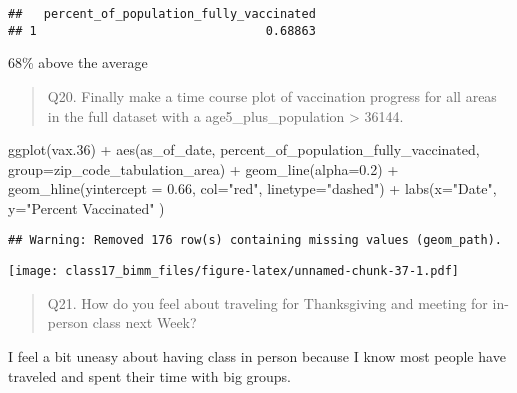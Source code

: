 \documentclass[
]{article}
\newenvironment{Shaded}{\begin{snugshade}}{\end{snugshade}}
\newcommand{\AttributeTok}[1]{\textcolor[rgb]{0.77,0.63,0.00}{#1}}
\newcommand{\FloatTok}[1]{\textcolor[rgb]{0.00,0.00,0.81}{#1}}
\newcommand{\FunctionTok}[1]{\textcolor[rgb]{0.00,0.00,0.00}{#1}}
\newcommand{\NormalTok}[1]{#1}
\newcommand{\SpecialCharTok}[1]{\textcolor[rgb]{0.00,0.00,0.00}{#1}}
\newcommand{\StringTok}[1]{\textcolor[rgb]{0.31,0.60,0.02}{#1}}
\begin{document}
\begin{verbatim}
##   percent_of_population_fully_vaccinated
## 1                                0.68863
\end{verbatim}

68\% above the average

\begin{quote}
Q20. Finally make a time course plot of vaccination progress for all
areas in the full dataset with a age5\_plus\_population \textgreater{}
36144.
\end{quote}

\begin{Shaded}
\begin{Highlighting}[]
\FunctionTok{ggplot}\NormalTok{(vax}\FloatTok{.36}\NormalTok{) }\SpecialCharTok{+} \FunctionTok{aes}\NormalTok{(as\_of\_date,}
\NormalTok{      percent\_of\_population\_fully\_vaccinated,}
      \AttributeTok{group=}\NormalTok{zip\_code\_tabulation\_area) }\SpecialCharTok{+} \FunctionTok{geom\_line}\NormalTok{(}\AttributeTok{alpha=}\FloatTok{0.2}\NormalTok{) }\SpecialCharTok{+} \FunctionTok{geom\_hline}\NormalTok{(}\AttributeTok{yintercept =} \FloatTok{0.66}\NormalTok{, }\AttributeTok{col=}\StringTok{"red"}\NormalTok{, }\AttributeTok{linetype=}\StringTok{"dashed"}\NormalTok{) }\SpecialCharTok{+} \FunctionTok{labs}\NormalTok{(}\AttributeTok{x=}\StringTok{"Date"}\NormalTok{, }\AttributeTok{y=}\StringTok{"Percent Vaccinated"}\NormalTok{ )}
\end{Highlighting}
\end{Shaded}

\begin{verbatim}
## Warning: Removed 176 row(s) containing missing values (geom_path).
\end{verbatim}

\texttt{[image: class17\_bimm\_files/figure-latex/unnamed-chunk-37-1.pdf]}

\begin{quote}
Q21. How do you feel about traveling for Thanksgiving and meeting for
in-person class next Week?
\end{quote}

I feel a bit uneasy about having class in person because I know most
people have traveled and spent their time with big groups.
\end{document}
